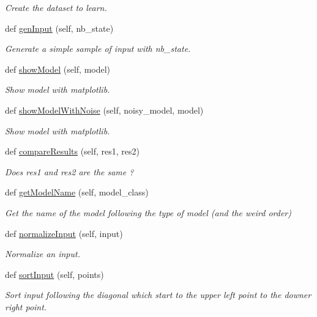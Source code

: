 \begin{DoxyCompactItemize}
\begin{DoxyCompactList}\small\item\em Create the dataset to learn. \end{DoxyCompactList}\item 
def \mbox{\hyperlink{classDatasetManager_1_1DatasetManager_aa947266c3671f93a2cc1d71722bb556f}{gen\+Input}} (self, nb\+\_\+state)
\begin{DoxyCompactList}\small\item\em Generate a simple sample of input with nb\+\_\+state. \end{DoxyCompactList}\item 
def \mbox{\hyperlink{classDatasetManager_1_1DatasetManager_aaa1d5165200cf8cec731fd8d08bdf2bc}{show\+Model}} (self, model)
\begin{DoxyCompactList}\small\item\em Show model with matplotlib. \end{DoxyCompactList}\item 
def \mbox{\hyperlink{classDatasetManager_1_1DatasetManager_ad25e44f84d74a74eae1c301ca29eb86f}{show\+Model\+With\+Noise}} (self, noisy\+\_\+model, model)
\begin{DoxyCompactList}\small\item\em Show model with matplotlib. \end{DoxyCompactList}\item 
def \mbox{\hyperlink{classDatasetManager_1_1DatasetManager_a47092104ac9bb0445ffbf3ad8e2727e0}{compare\+Results}} (self, res1, res2)
\begin{DoxyCompactList}\small\item\em Does res1 and res2 are the same ? \end{DoxyCompactList}\item 
def \mbox{\hyperlink{classDatasetManager_1_1DatasetManager_a2764d554ac8ce8cdbe0e1c9839fee312}{get\+Model\+Name}} (self, model\+\_\+class)
\begin{DoxyCompactList}\small\item\em Get the name of the model following the type of model (and the weird order) \end{DoxyCompactList}\item 
def \mbox{\hyperlink{classDatasetManager_1_1DatasetManager_ad99fc67b1ea1caa9660d7fd0e2824a61}{normalize\+Input}} (self, input)
\begin{DoxyCompactList}\small\item\em Normalize an input. \end{DoxyCompactList}\item 
def \mbox{\hyperlink{classDatasetManager_1_1DatasetManager_a84619ad2806ca24a87c3064f2d7bb23d}{sort\+Input}} (self, points)
\begin{DoxyCompactList}\small\item\em Sort input following the diagonal which start to the upper left point to the downer right point. \end{DoxyCompactList}\end{DoxyCompactItemize}

